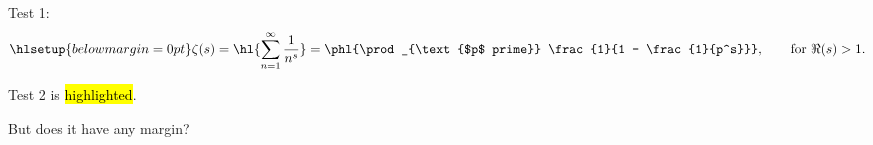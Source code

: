 \documentclass{article}
\begin{document}
Test 1:
\[ \hlsetup{belowmargin=0pt}
  \zeta(s) = \hl{\sum_{n = 1}^\infty \frac{1}{n^s}}
    = \phl{\prod_{\text{$p$ prime}} \frac{1}{1 - \frac{1}{p^s}}}, 
    \qquad\text{for $\Re(s) > 1$.}
\]

Test 2 is \hl{highlighted}. \par But does it have any margin?
\end{document}
